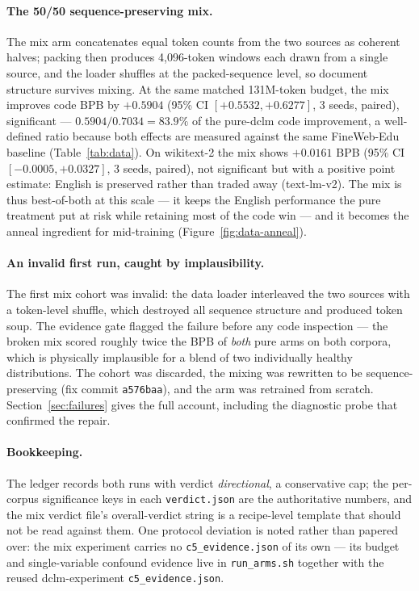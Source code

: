 \paragraph{The 50/50 sequence-preserving mix.} The mix arm concatenates equal token counts from the two sources as coherent halves; packing then produces 4{,}096-token windows each drawn from a single source, and the loader shuffles at the packed-sequence level, so document structure survives mixing. At the same matched 131M-token budget, the mix improves code BPB by $+0.5904$ (95\% CI $[+0.5532, +0.6277]$, 3 seeds, paired), significant --- $0.5904/0.7034 = 83.9\%$ of the pure-dclm code improvement, a well-defined ratio because both effects are measured against the same FineWeb-Edu baseline (Table~\ref{tab:data}). On wikitext-2 the mix shows $+0.0161$ BPB (95\% CI $[-0.0005, +0.0327]$, 3 seeds, paired), not significant but with a positive point estimate: English is preserved rather than traded away (text-lm-v2). The mix is thus best-of-both at this scale --- it keeps the English performance the pure treatment put at risk while retaining most of the code win --- and it becomes the anneal ingredient for mid-training (Figure~\ref{fig:data-anneal}).

\paragraph{An invalid first run, caught by implausibility.} The first mix cohort was invalid: the data loader interleaved the two sources with a token-level shuffle, which destroyed all sequence structure and produced token soup. The evidence gate flagged the failure before any code inspection --- the broken mix scored roughly twice the BPB of \emph{both} pure arms on both corpora, which is physically implausible for a blend of two individually healthy distributions. The cohort was discarded, the mixing was rewritten to be sequence-preserving (fix commit \texttt{a576baa}), and the arm was retrained from scratch. Section~\ref{sec:failures} gives the full account, including the diagnostic probe that confirmed the repair.

\paragraph{Bookkeeping.} The ledger records both runs with verdict \emph{directional}, a conservative cap; the per-corpus significance keys in each \texttt{verdict.json} are the authoritative numbers, and the mix verdict file's overall-verdict string is a recipe-level template that should not be read against them. One protocol deviation is noted rather than papered over: the mix experiment carries no \texttt{c5\_evidence.json} of its own --- its budget and single-variable confound evidence live in \texttt{run\_arms.sh} together with the reused dclm-experiment \texttt{c5\_evidence.json}.
